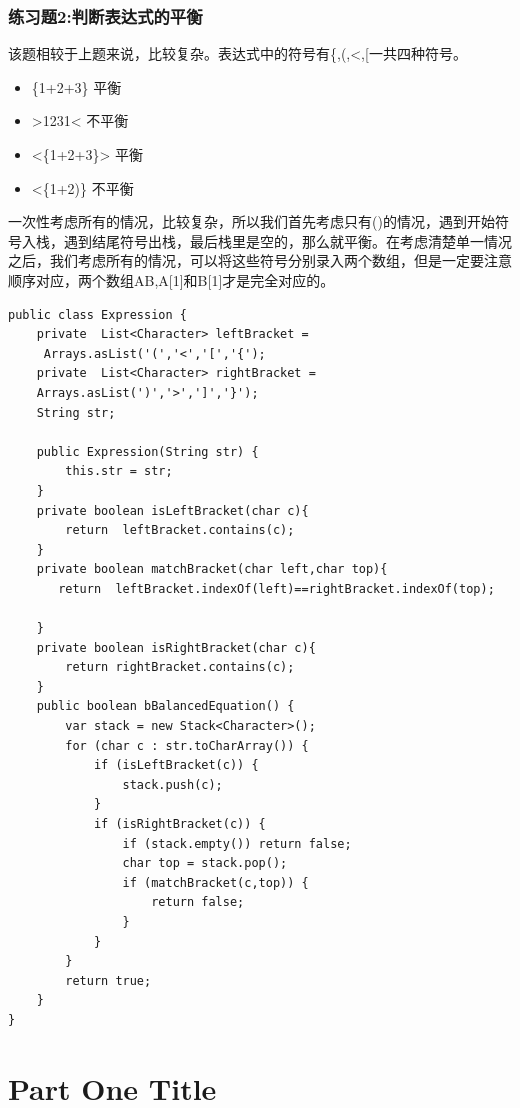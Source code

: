 \documentclass[
	11pt,
	fleqn,
	a4paper,
]{LegrandOrangeBook}
\begin{document}
\section{练习题2:判断表达式的平衡}
\begin{example}
    该题相较于上题来说，比较复杂。表达式中的符号有\{,(,<,[一共四种符号。
    \begin{itemize}
        \item \{1+2+3\} 平衡
        \item >1231< 不平衡
        \item <\{1+2+3\}> 平衡
        \item <\{1+2)\} 不平衡
    \end{itemize}
    一次性考虑所有的情况，比较复杂，所以我们首先考虑只有()的情况，遇到开始符号入栈，遇到结尾符号出栈，最后栈里是空的，那么就平衡。在考虑清楚单一情况之后，我们考虑所有的情况，可以将这些符号分别录入两个数组，但是一定要注意顺序对应，两个数组AB,A[1]和B[1]才是完全对应的。
    \begin{verbatim}
public class Expression {
    private  List<Character> leftBracket =
     Arrays.asList('(','<','[','{');
    private  List<Character> rightBracket =
    Arrays.asList(')','>',']','}');
    String str;

    public Expression(String str) {
        this.str = str;
    }
    private boolean isLeftBracket(char c){
        return  leftBracket.contains(c);
    }
    private boolean matchBracket(char left,char top){
       return  leftBracket.indexOf(left)==rightBracket.indexOf(top);

    }
    private boolean isRightBracket(char c){
        return rightBracket.contains(c);
    }
    public boolean bBalancedEquation() {
        var stack = new Stack<Character>();
        for (char c : str.toCharArray()) {
            if (isLeftBracket(c)) {
                stack.push(c);
            }
            if (isRightBracket(c)) {
                if (stack.empty()) return false;
                char top = stack.pop();
                if (matchBracket(c,top)) {
                    return false;
                }
            }
        }
        return true;
    }
}

    \end{verbatim}
\end{example}
\part{Part One Title}

\end{document}

